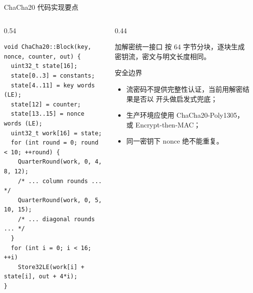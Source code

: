 \documentclass[aspectratio=169,10pt]{beamer}
\newcommand{\code}[1]{\texttt{\small\detokenize{#1}}}
\begin{document}
\begin{frame}[fragile]{ChaCha20 代码实现要点}
  \begin{columns}[T]
    \begin{column}{0.54\textwidth}
      \begin{lstlisting}[style=cppstyle,basicstyle=\ttfamily\scriptsize]
void ChaCha20::Block(key, nonce, counter, out) {
  uint32_t state[16];
  state[0..3] = constants;
  state[4..11] = key words (LE);
  state[12] = counter;
  state[13..15] = nonce words (LE);
  uint32_t work[16] = state;
  for (int round = 0; round < 10; ++round) {
    QuarterRound(work, 0, 4, 8, 12);
    /* ... column rounds ... */
    QuarterRound(work, 0, 5, 10, 15);
    /* ... diagonal rounds ... */
  }
  for (int i = 0; i < 16; ++i)
    Store32LE(work[i] + state[i], out + 4*i);
}
      \end{lstlisting}
    \end{column}
    \begin{column}{0.44\textwidth}
      \begin{block}{加解密统一接口}
        \small
        \code{Crypt()} 按 64 字节分块，逐块生成密钥流，密文与明文长度相同。
      \end{block}
      \begin{alertblock}{安全边界}
        \small
        \begin{itemize}
          \item 流密码不提供完整性认证，当前用解密结果是否以 \code{Subject:} 开头做启发式兜底；
          \item 生产环境应使用 ChaCha20-Poly1305，或 Encrypt-then-MAC；
          \item 同一密钥下 nonce 绝不能重复。
        \end{itemize}
      \end{alertblock}
    \end{column}
  \end{columns}
\end{frame}
\end{document}
